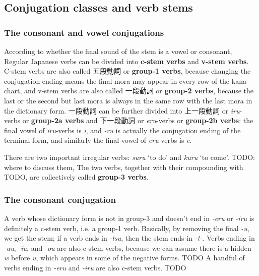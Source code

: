 \documentclass[UTF8, a4paper, oneside, scheme=plain]{ctexart}
\newcommand*{\concept}[1]{\textbf{#1}}
\newcommand{\corpus}[1]{\emph{#1}}
\newcommand{\translate}[1]{`#1'}
\begin{document}
\subsection{Conjugation classes and verb stems}\label{sec:conjugation-class}

\subsubsection{The consonant and vowel conjugations}

According to whether the final sound of the stem is a vowel or consonant,
Regular Japanese verbs can be divided into \concept{c-stem verbs} and \concept{v-stem verbs}.
C-stem verbs are also called 五段動詞 or \concept{group-1 verbs},
because changing the conjugation ending means the final mora may appear in every row of the kana chart, 
and v-stem verbs are also called 一段動詞 or \concept{group-2 verbs},
because the last or the second but last mora is always in the same row with the last mora in the dictionary form.
一段動詞 can be further divided into 上一段動詞 or \corpus{iru}-verbs or \concept{group-2a verbs} 
and 下一段動詞 or \corpus{eru}-verbs or \concept{group-2b verbs}:
the final vowel of \corpus{iru}-verbs is \corpus{i},
and \corpus{-ru} is actually the conjugation ending of the terminal form,
and similarly the final vowel of \corpus{eru}-verbs is \corpus{e}.

There are two important irregular verbs: \corpus{suru} \translate{to do} and \corpus{kuru} \translate{to come}.
TODO: where to discuss them, 
The two verbs, together with their compounding with TODO,
are collectively called \concept{group-3 verbs}.

\subsubsection{The consonant conjugation}\label{sec:consonant-class}

A verb whose dictionary form is not in group-3 and doesn't end in \corpus{-eru} or \corpus{-iru} 
is definitely a c-stem verb, i.e. a group-1 verb.
Basically, by removing the final \corpus{-u}, we get the stem;
if a verb ends in \corpus{-tsu},
then the stem ends in \corpus{-t-}.
Verbs ending in \corpus{-au}, \corpus{-iu}, and \corpus{-ou} are also c-stem verbs,
because we can assume there is a hidden \corpus{w} before \corpus{u},
which appears in some of the negative forms. TODO
A handful of verbs ending in \corpus{-eru} and \corpus{-iru} are also c-stem verbs. TODO
\end{document}
